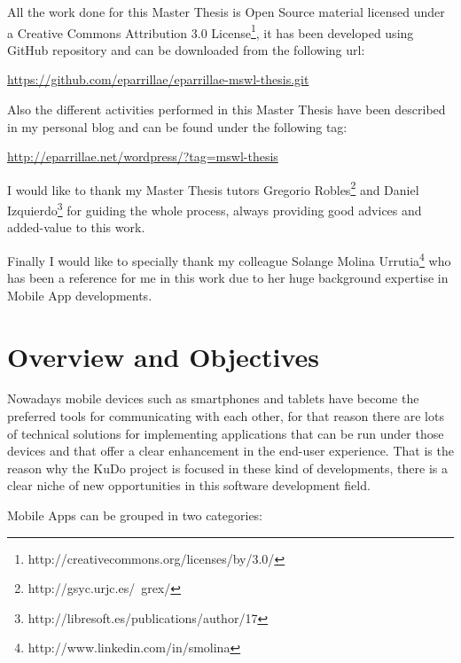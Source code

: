 \documentclass[a4paper,12pt]{book}
\begin{document}
All the work done for this Master Thesis is Open Source material licensed under a Creative Commons Attribution 3.0 License\footnote{http://creativecommons.org/licenses/by/3.0/}, it has been developed using GitHub repository and can be downloaded from the following url:

\url{
https://github.com/eparrillae/eparrillae-mswl-thesis.git}


Also the different activities performed in this Master Thesis have been described in my personal blog and can be found under the following tag:

\url{
http://eparrillae.net/wordpress/?tag=mswl-thesis}


I would like to thank my Master Thesis tutors Gregorio Robles\footnote{http://gsyc.urjc.es/~grex/}  and Daniel Izquierdo\footnote{http://libresoft.es/publications/author/17} for guiding the whole process, always providing good advices and added-value to this work.


Finally I would like to specially thank my colleague Solange Molina Urrutia\footnote{http://www.linkedin.com/in/smolina} who has been a reference for me in this work due to her huge background expertise in Mobile App developments.  



\chapter{Overview and Objectives}
\label{chap:overview}

Nowadays mobile devices such as smartphones and tablets have become the preferred tools for communicating with each other, for that reason there are lots of technical solutions for implementing applications that can be run under those devices and that offer a clear enhancement in the end-user experience. That is the reason why the KuDo project is focused in these kind of developments, there is a clear niche of new opportunities in this software development field.

Mobile Apps can be grouped in two categories:
\end{document}
